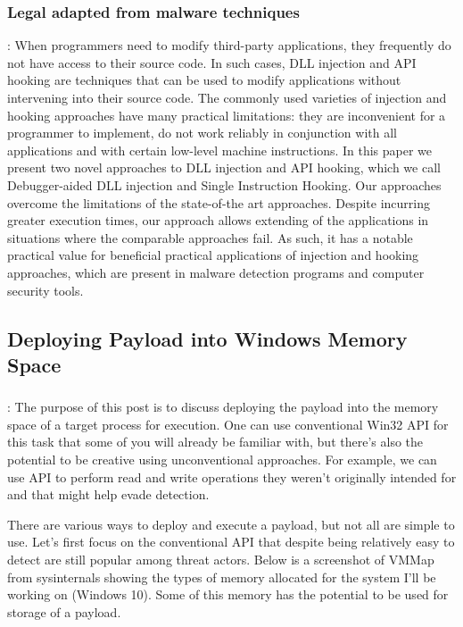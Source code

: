 \documentclass{article}
\begin{document}
\subsubsection{\textcite{Berdajs:2010} Legal adapted from malware techniques}
\textbf{}: When programmers need to modify third-party applications, they frequently do not have access to their source code. In such cases, DLL injection and API hooking are techniques that can be used to modify applications without intervening into their source code. The commonly used varieties of injection and hooking approaches have many practical limitations: they are inconvenient for a programmer to implement, do not work reliably in conjunction with all applications and with certain low-level machine instructions. In this paper we present two novel approaches to DLL injection and API hooking, which we call Debugger-aided DLL injection and Single Instruction Hooking. Our approaches overcome the limitations of the state-of-the art approaches. Despite incurring greater execution times, our approach allows extending of the applications in situations where the comparable approaches fail. As such, it has a notable practical value for beneficial practical applications of injection and hooking approaches, which are present in malware detection programs and computer security tools.



\subsection{Deploying Payload into Windows Memory Space}

\subsubsection{\textcite{Zhan:2018}}
\textbf{}:  The purpose of this post is to discuss deploying the payload into the memory space of a target process for execution. One can use conventional Win32 API for this task that some of you will already be familiar with, but there’s also the potential to be creative using unconventional approaches. For example, we can use API to perform read and write operations they weren’t originally intended for and that might help evade detection.

There are various ways to deploy and execute a payload, but not all are simple to use. Let’s first focus on the conventional API that despite being relatively easy to detect are still popular among threat actors.
Below is a screenshot of VMMap from sysinternals showing the types of memory allocated for the system I’ll be working on (Windows 10). Some of this memory has the potential to be used for storage of a payload.
\end{document}
